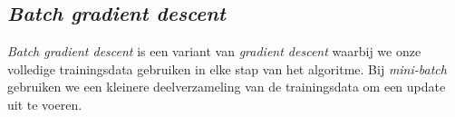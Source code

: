 \subsection{\textit{Batch gradient descent}}

\textit{Batch gradient descent} is een variant van \textit{gradient descent} waarbij we onze volledige trainingsdata gebruiken in elke stap van het algoritme. Bij \textit{mini-batch} gebruiken we een kleinere deelverzameling van de trainingsdata om een update uit te voeren. 